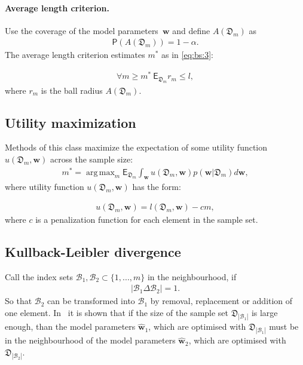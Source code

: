 \documentclass[
11pt,%
tightenlines,%
twoside,%
onecolumn,%
nofloats,%
nobibnotes,%
nofootinbib,%
superscriptaddress,%
noshowpacs,%
centertags]%
{revtex4}
\DeclareMathOperator*{\argmax}{arg\,max}
\begin{document}
\paragraph{Average length criterion.}
Use the coverage of the model parameters~$\textbf{w}$ and define $A\left(\mathfrak{D}_{m}\right)$ as
\[
\label{eq:bs:4}
\begin{aligned}
	\mathsf{P}\left(A\left(\mathfrak{D}_{m}\right)\right) =  1- \alpha.
\end{aligned}
\]
The average length criterion estimates  $m^*$ as in \eqref{eq:bs:3}:
	
\[
\label{eq:bs:5}
\begin{aligned}
	\forall m \geq m^*  ~ \mathsf{E}_{\mathfrak{D}_m}r_m\leq l,
\end{aligned}
\]
where $r_m$ is the ball radius $A\left(\mathfrak{D}_{m}\right)$.

\subsection{Utility maximization}
Methods of this class maximize the expectation of some utility function $u\left(\mathfrak{D}_{m}, \textbf{w}\right)$ across the sample size:
\[
\label{eq:bs:6}
\begin{aligned}
	m^* = \argmax_{m} \mathsf{E}_{\mathfrak{D}_m}\int_{\textbf{w}}u\left(\mathfrak{D}_m, \textbf{w}\right)p(\textbf{w}|\mathfrak{D}_m)d\textbf{w},
\end{aligned}
\]
where utility function $u\left(\mathfrak{D}_{m}, \textbf{w}\right)$ has the form:

\[
\label{eq:bs:7}
\begin{aligned}
	u\left(\mathfrak{D}_m, \textbf{w}\right) = l\left(\mathfrak{D}_m, \textbf{w}\right) - cm,
\end{aligned}
\]
 where $c$  is a penalization function for each element in the sample set.  
	 
\subsection{Kullback-Leibler divergence}
Call the index  sets $\mathcal{B}_1,\mathcal{B}_2 \subset \{1,...,m\}$ in the neighbourhood, if
\[
\label{eq:bs:8}
\begin{aligned}
	\left|\mathcal{B}_1 \Delta \mathcal{B}_2\right| = 1.
\end{aligned}
\]
So that $\mathcal{B}_2$ can be transformed into $\mathcal{B}_1$ by removal, replacement or addition of one element. In~\cite{motrenko2014} it is shown that if the size of the sample set $\mathfrak{D}_{|\mathcal{B}_1|}$ is large enough, than the model  parameters $\hat{\textbf{w}}_1$, which  are optimised with $\mathfrak{D}_{|\mathcal{B}_1|}$ must be in the neighbourhood of the model parameters $\hat{\textbf{w}}_2$, which are optimised with $\mathfrak{D}_{|\mathcal{B}_2|}$. 
	 
\end{document}
